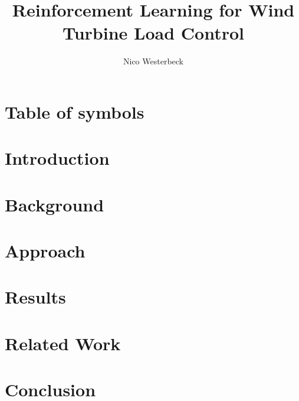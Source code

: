 \documentclass[color]{tudbook}  %
\begin{document}
\diplom

\author{Nico Westerbeck}
\title{Reinforcement Learning for Wind Turbine Load Control}
\submitdate{\today}

\maketitle


\newpage
\confirmation

\begin{abstract}

\end{abstract}

\tableofcontents

\chapter*{Table of symbols}


\chapter{Introduction}


\chapter{Background}


\chapter{Approach}


\chapter{Results}


\chapter{Related Work}


\chapter{Conclusion}


% 

{}

\end{document}
